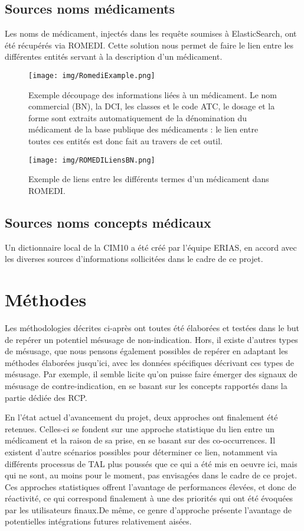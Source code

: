 \documentclass[a4paper, 12pt, openany, oneside, abstract=on]{article} %
\begin{document}
\subsection{Sources noms médicaments}
Les noms de médicament, injectés dans les requête soumises à ElasticSearch, ont été récupérés via ROMEDI\cite{Cossin2018}. Cette solution nous permet de faire le lien entre les différentes entités servant à la description d'un médicament.
\begin{figure}[H]
    \centering
    \texttt{[image: img/RomediExample.png]}
    \caption{\label{fig:ROMEDIExample}Exemple découpage des informations liées à un médicament. Le nom commercial (BN), la DCI, les classes et le code ATC, le dosage et la forme sont extraits automatiquement de la dénomination du médicament de la base publique des médicaments : le lien entre toutes ces entités est donc fait au travers de cet outil.}
\end{figure}

\begin{figure}[H]
    \centering
    \texttt{[image: img/ROMEDILiensBN.png]}
    \caption{\label{fig:ROMEDILiens}Exemple de liens entre les différents termes d’un médicament dans ROMEDI.}
\end{figure}

\subsection{Sources noms concepts médicaux}
Un dictionnaire local de la CIM10 a été créé par l'équipe ERIAS, en accord avec les diverses sources d'informations sollicitées dans le cadre de ce projet.

\section{Méthodes}
\label{MéthodoDoMINO}
Les méthodologies décrites ci-après ont toutes été élaborées et testées dans le but de repérer un potentiel mésusage de non-indication. Hors, il existe d'autres types de mésusage, que nous pensons également possibles de repérer en adaptant les méthodes élaborées jusqu'ici, avec les données spécifiques décrivant ces types de mésusage. Par exemple, il semble licite qu'on puisse faire émerger des signaux de mésusage de contre-indication, en se basant sur les concepts rapportés dans la partie dédiée des RCP.

En l'état actuel d'avancement du projet, deux approches ont finalement été retenues. Celles-ci se fondent sur une approche statistique du lien entre un médicament et la raison de sa prise, en se basant sur des co-occurrences. Il existent d'autre scénarios possibles pour déterminer ce lien, notamment via différents processus de TAL plus poussés que ce qui a été mis en oeuvre ici, mais qui ne sont, au moins pour le moment, pas envisagées dans le cadre de ce projet.\\
Ces approches statistiques offrent l'avantage de performances élevées, et donc de réactivité, ce qui correspond finalement à une des priorités qui ont été évoquées par les utilisateurs finaux.De même, ce genre d'approche présente l'avantage de potentielles intégrations futures relativement aisées.
\end{document}
